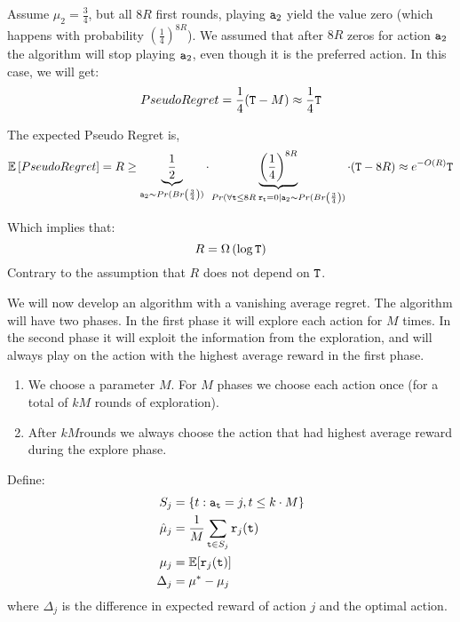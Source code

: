 
Assume $\mu_2 = \frac{3}{4}$, but all $8R$ first rounds, playing
${\tt a}_2$ yield the value zero (which happens with probability
$\left(\frac{1}{4}\right)^{8R}$). We assumed that after $8R$ zeros
for action ${\tt a}_2$ the algorithm will stop playing ${\tt a}_2$, even though
it is the preferred action. In this case, we will get:
\[
Pseudo Regret = \frac{1}{4} ({\tt T} - M) \approx \frac{1}{4}{\tt T}
\]

The expected Pseudo Regret is,
\[
\mathbb{E}\left[Pseudo Regret\right] = R \geq
\underbrace{\frac{1}{2}}_{{\tt a}_{2}\sim Pr(Br\left(\frac{3}{4}\right))}
\cdot \underbrace{\left(\frac{1}{4}\right)^{8R}}_{Pr(\forall {\tt t}\leq 8R \; {\tt r}_{\tt t}= 0 |
{\tt a}_{2}\sim Pr(Br\left(\frac{3}{4}\right))} \cdot ({\tt T} - 8R) \approx
e^{-O(R)}{\tt T}
\]

Which implies that:
\[
R=\Omega\left(\log {\tt T}\right)
\]
Contrary to the assumption that $R$ does not depend on ${\tt T}$.


We will now develop an algorithm with a vanishing average regret. The algorithm will have two phases. In the first phase it will explore each action for $M$ times. In the second phase it will exploit the information from the exploration, and will always play on the action with the highest average reward in the first phase.

\begin{enumerate}
%
\item We choose a parameter $M$.
%
For $M$ phases we choose each action once (for a total of $kM$
rounds of exploration).
%
\item After $kM$rounds we always choose the action that had highest
average reward during the explore phase.
\end{enumerate}

Define:
\begin{align*}
S_{j}&= \left\{ t:{\tt a}_{{\tt t}}=j,t\le k\cdot M\right\}\\
\hat{\mu}_{j}&=\frac{1}{M} \sum_{{\tt t}\in S_{j}}{\tt r}_{j}({\tt t})\\
\mu_{j}&=\mathbb{E}[{\tt r}_{j}({\tt t})]\\
\Delta_{j}&=\mu^{*}-\mu_{j}
\end{align*}
where $\Delta_j$ is the difference in expected reward of action $j$
and the optimal action.

